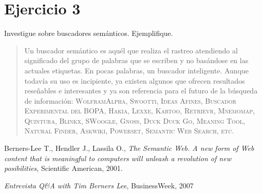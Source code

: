 \documentclass[a4paper,12pt,oneside,final,spanish]{article}
\begin{document}
\section{Ejercicio 3}

Investigue sobre buscadores semánticos. Ejemplifique.

\begin{quote}
Un buscador semántico es aquél que realiza el rastreo atendiendo al significado del grupo de palabras que se escriben y no basándose en las actuales etiquetas. En pocas palabras, un buscador inteligente. Aunque todavía su uso es incipiente, ya existen algunos que ofrecen resultados reseñables e interesantes y ya son referencia para el futuro de la búsqueda de información: \textsc{WolframAlpha, Swootti, Ideas Afines, Buscador Experimental del BOPA, Hakia, Lexxe, Kartoo, Retrievr, Mnemomap, Quintura, Blinkx, SWoogle, Gnoss, Duck Duck Go, Meaning Tool, Natural Finder, Askwiki, Powerset, Semantic Web Search, etc.}  
\end{quote}

\begin{thebibliography}{1}
Berners-Lee  T., Hendler J., Lassila  O.,
\emph{The Semantic Web. A new form of Web content that is meaningful to computers will unleash a revolution of new posibilities},
Scientific American,
2001.

\emph{Entrevista Q\&A with Tim Berners Lee},
BusinessWeek,
2007
\end{thebibliography}
\end{document}
